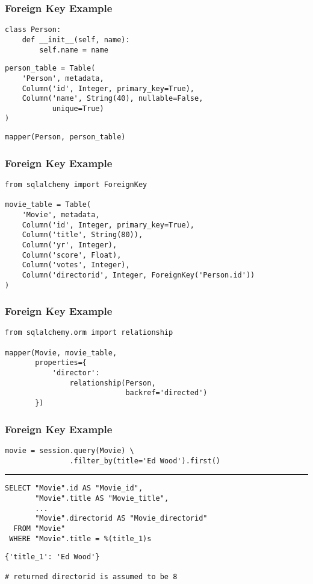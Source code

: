 \documentclass[dvipsnames]{beamer}
\theoremstyle{plain}
\begin{document}
\begin{frame}[fragile]
  \frametitle{Foreign Key Example}

  \begin{lstlisting}
class Person:
    def __init__(self, name):
        self.name = name
  \end{lstlisting}

  \begin{lstlisting}
person_table = Table(
    'Person', metadata,
    Column('id', Integer, primary_key=True),
    Column('name', String(40), nullable=False,
           unique=True)
)
  \end{lstlisting}

  \begin{lstlisting}
mapper(Person, person_table)
  \end{lstlisting}
\end{frame}

\begin{frame}[fragile]
  \frametitle{Foreign Key Example}

  \begin{lstlisting}
from sqlalchemy import ForeignKey

movie_table = Table(
    'Movie', metadata,
    Column('id', Integer, primary_key=True),
    Column('title', String(80)),
    Column('yr', Integer),
    Column('score', Float),
    Column('votes', Integer),
    Column('directorid', Integer, ForeignKey('Person.id'))
)
  \end{lstlisting}
\end{frame}

\begin{frame}[fragile]
  \frametitle{Foreign Key Example}

  \begin{lstlisting}
from sqlalchemy.orm import relationship

mapper(Movie, movie_table,
       properties={
           'director':
               relationship(Person,
                            backref='directed')
       })
  \end{lstlisting}
\end{frame}

\begin{frame}[fragile]
  \frametitle{Foreign Key Example}

  \begin{lstlisting}
movie = session.query(Movie) \
               .filter_by(title='Ed Wood').first()
  \end{lstlisting}
  \hrule

  \begin{lstlisting}[language=FullSQL]
SELECT "Movie".id AS "Movie_id",
       "Movie".title AS "Movie_title",
       ...
       "Movie".directorid AS "Movie_directorid"
  FROM "Movie"
 WHERE "Movie".title = %(title_1)s
  \end{lstlisting}

  \begin{lstlisting}
{'title_1': 'Ed Wood'}

# returned directorid is assumed to be 8
  \end{lstlisting}
\end{frame}
\end{document}
